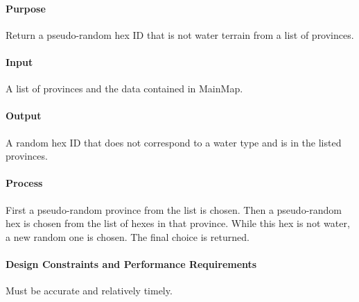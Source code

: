 \documentclass[12pt,a4paper,titlepage]{article}
\begin{document}
\paragraph{Purpose} Return a pseudo-random hex ID that is not water terrain from a list of provinces.
\paragraph{Input} A list of provinces and the data contained in MainMap.
\paragraph{Output} A random hex ID that does not correspond to a water type and is in the listed provinces.
\paragraph{Process} First a pseudo-random province from the list is chosen. Then a pseudo-random hex is chosen from the list of hexes in that province. While this hex is not water, a new random one is chosen. The final choice is returned.
\paragraph{Design Constraints and Performance Requirements} Must be accurate and relatively timely.
\end{document}
